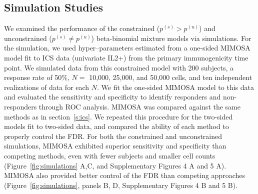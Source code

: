 \documentclass[12pt,oupdraft]{biostatistics}
\begin{document}
\subsection{Simulation Studies}

We examined the performance of the constrained ($p^{(s)}>p^{(u)}$) and unconstrained ($p^{(s)} \ne p^{(u)}$) beta-binomial mixture models via simulations. For the simulation, we used hyper--parameters estimated from a one-sided MIMOSA model fit to ICS data (univariate IL2+) from the primary immunogenicity time point. We simulated data from this constrained model with 200 subjects, a response rate of 50\%, $N=$ 10,000, 25,000, and 50,000 cells, and ten independent realizations of data for each $N$. We fit the one-sided MIMOSA model to this data and evaluated the sensitivity and specificity to identify responders and non-responders through ROC analysis. MIMOSA was compared against the same methods as in section~\ref{s:ics}. We repeated this procedure for the two-sided models fit to two-sided data, and compared the ability of each method to properly control the FDR.
For both the constrained and unconstrained simulations, MIMOSA exhibited superior sensitivity and specificity than competing methods, even with fewer subjects and smaller cell counts (Figure~\ref{fig:simulations} A,C, and Supplementary Figures 4 A and 5 A). MIMOSA also provided better control of the FDR than competing approaches (Figure~\ref{fig:simulations}, panels B, D, Supplementary Figures 4 B and 5 B). 
\end{document}
